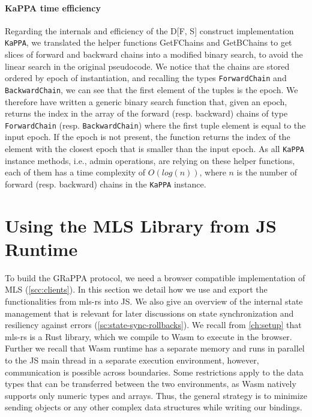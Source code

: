 \paragraph{KaPPA time efficiency}

Regarding the internals and efficiency of the D[F, S] construct
implementation \texttt{KaPPA}, we translated the helper functions 
GetFChains and GetBChains to get
slices of forward and backward chains into a modified binary search,
to avoid the linear search in the original pseudocode.
We notice that the chains are stored ordered by epoch of instantiation,
and recalling the types \texttt{ForwardChain} and \texttt{BackwardChain},
we can see that the first element of the tuples is the epoch.
We therefore have written a generic binary search function that,
given an epoch, returns the index in the array of the forward (resp. backward)
chains of type \texttt{ForwardChain} (resp. \texttt{BackwardChain})
where the first tuple element is equal to the input epoch. If the epoch is not
present, the function returns the index of the element with the 
closest epoch that is smaller than the input epoch.
As all \texttt{KaPPA} instance methods, i.e., admin operations,
are relying on these helper functions, each of them has a time
complexity of $O(log(n))$, where $n$ is the number of forward (resp. backward)
chains in the \texttt{KaPPA} instance.

\section{Using the MLS Library from JS Runtime}\label{sc:js-bindings-for-mls}

To build the GRaPPA protocol, we need a browser compatible implementation
of MLS (\cref{scc:clients}).
In this section we detail how we use and export the functionalities from mls-rs
into JS. We also give an overview of the internal state management
that is relevant for later discussions on state synchronization and resiliency
against errors (\cref{sc:state-sync-rollbacks}).
We recall from \cref{ch:setup} that mls-rs is a Rust library, which we
compile to Wasm to execute in the browser.
Further we recall that Wasm runtime has a separate memory and runs in parallel
to the JS main thread in a separate execution environment, however, communication
is possible across boundaries. Some restrictions apply to the data types
that can be transferred between the two environments, as Wasm natively supports
only numeric types and arrays. Thus, the general strategy 
is to minimize sending objects or any other complex data structures 
while writing our bindings.

